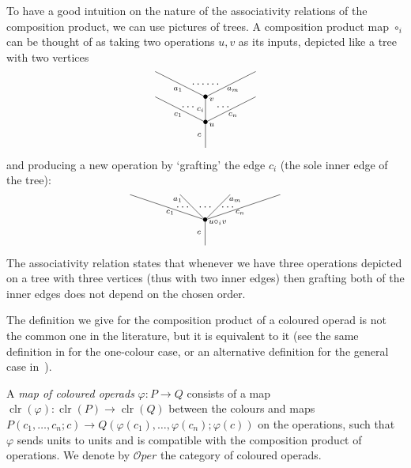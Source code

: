\documentclass[a4paper]{amsart}
\theoremstyle{plain}
\theoremstyle{definition}
\theoremstyle{remark}
\DeclareMathOperator{\clr}{clr}
\newcommand{\To}{\longrightarrow}
\newcommand{\Oper}{\mathcal{O}per}
\numberwithin{equation}{section}
\numberwithin{figure}{section}
\begin{document}
To have a good intuition on the nature of the associativity
relations of the composition product, we can use pictures of trees.
A composition product map $\circ_i$ can be thought of as taking  two
operations $u, v$ as its inputs, depicted like a tree with two
vertices
$$
\xy<0.08cm, 0cm>:
(0,0)*{}="1";
(0,10)*=0{\bullet}="2";
(0,20)*=0{\bullet}="2a";
(-20,20)*{}="3";
(20,20)*{}="4";
(-20,30)*{}="5";
(20,30)*{}="6";
"1";"2" **\dir{-};
"2";"3" **\dir{-};
"2";"4" **\dir{-};
"2";"2a" **\dir{-};
"2a";"5" **\dir{-};
"2a";"6" **\dir{-};
(-2.5,5)*=0{\scriptstyle c};
(-11, 13)*=0{\scriptstyle c_1};
(11, 13)*=0{\scriptstyle c_n};
(2.5, 9)*=0{\scriptstyle u};
(-2,15)*=0{\scriptstyle c_i};
(-7, 16)*=0{\cdots};
(7, 16)*=0{\cdots};
(-11, 23)*=0{\scriptstyle a_1};
(11, 23)*=0{\scriptstyle a_m};
(2.5, 19)*=0{\scriptstyle v};
(0, 25)*=0{\cdots\cdots};
\endxy
$$
and producing a new operation by `grafting' the edge $c_i$ (the sole inner edge of the tree):
$$
\xy<0.08cm, 0cm>:
(0,0)*{}="1";
(0,10)*=0{\bullet}="2";
(-10,20)*{}="3";
(10,20)*{}="4";
(-30,20)*{}="5";
(30,20)*{}="6";
"1";"2" **\dir{-};
"2";"3" **\dir{-};
"2";"4" **\dir{-};
"2";"5" **\dir{-};
"2";"6" **\dir{-};
(-2.5,5)*=0{\scriptstyle c};
(-14, 13)*=0{\scriptstyle c_1};
(12, 18)*=0{\scriptstyle a_m};
(-11, 18)*=0{\scriptstyle a_1};
(14, 13)*=0{\scriptstyle c_n};
(5, 9)*=0{\scriptstyle u\circ_i v};
(0, 15)*=0{\cdots};
(9, 15)*=0{\cdots};
(-9, 15)*=0{\cdots};
\endxy
$$
The associativity relation states that whenever we have three operations depicted on a tree with three vertices (thus
with two inner edges) then grafting both of the inner edges does not depend on the chosen order.

The definition we give for the composition product of a coloured operad is not the common one in the literature, but it is
equivalent to it (see the same definition in \cite{markl} for the one-colour case, or an alternative definition for the
general case in~\cite{bergermoerdijk,leinster,moerdijkweiss}).


A \textit{map of coloured operads} $\varphi\colon P\To Q$ consists of a map $\clr(\varphi)\colon
\clr(P)\To \clr(Q)$ between the colours and maps
$P(c_1,\ldots, c_n;c)\To Q(\varphi(c_1),\ldots,
\varphi(c_n);\varphi(c))$ on the operations, such that $\varphi$
sends units to units and is compatible with the composition product
of operations. We denote by $\Oper$ the category of coloured operads.
\end{document}
